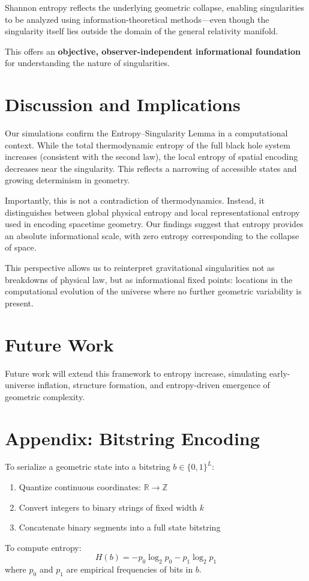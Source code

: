 \documentclass[11pt]{article}
\begin{document}
Shannon entropy reflects the underlying geometric collapse, enabling singularities to be analyzed using information-theoretical methods---even though the singularity itself lies outside the domain of the general relativity manifold.

This offers an \textbf{objective, observer-independent informational foundation} for understanding the nature of singularities.


\section{Discussion and Implications}

Our simulations confirm the Entropy--Singularity Lemma in a computational context. While the total thermodynamic entropy of the full black hole system increases (consistent with the second law), the local entropy of spatial encoding decreases near the singularity. This reflects a narrowing of accessible states and growing determinism in geometry.

Importantly, this is not a contradiction of thermodynamics. Instead, it distinguishes between global physical entropy and local representational entropy used in encoding spacetime geometry. Our findings suggest that entropy provides an absolute informational scale, with zero entropy corresponding to the collapse of space.

This perspective allows us to reinterpret gravitational singularities not as breakdowns of physical law, but as informational fixed points: locations in the computational evolution of the universe where no further geometric variability is present.


\section{Future Work}

Future work will extend this framework to entropy increase, simulating early-universe inflation, structure formation, and entropy-driven emergence of geometric complexity.


\appendix

\section{Appendix: Bitstring Encoding}

To serialize a geometric state into a bitstring $b \in \{0,1\}^L$:
\begin{enumerate}
  \item Quantize continuous coordinates: $\mathbb{R} \to \mathbb{Z}$
  \item Convert integers to binary strings of fixed width $k$
  \item Concatenate binary segments into a full state bitstring
\end{enumerate}

To compute entropy:
\[
  H(b) = -p_0 \log_2 p_0 - p_1 \log_2 p_1
\]
where $p_0$ and $p_1$ are empirical frequencies of bits in $b$.

\printbibliography
\end{document}
